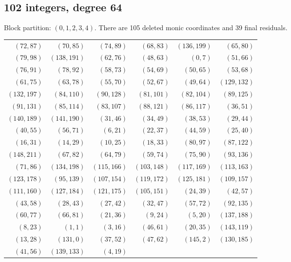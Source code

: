\subsection{102 integers, degree 64}
Block partition: $(0,1,2,3,4)$.
There are 105 deleted monic coordinates and 39 final residuals.
\begin{center}\small\begin{tabular}{rrrrrr}\toprule
$(72,87)$ & $(70,85)$ & $(74,89)$ & $(68,83)$ & $(136,199)$ & $(65,80)$\\
$(79,98)$ & $(138,191)$ & $(62,76)$ & $(48,63)$ & $(0,7)$ & $(51,66)$\\
$(76,91)$ & $(78,92)$ & $(58,73)$ & $(54,69)$ & $(50,65)$ & $(53,68)$\\
$(61,75)$ & $(63,78)$ & $(55,70)$ & $(52,67)$ & $(49,64)$ & $(129,132)$\\
$(132,197)$ & $(84,110)$ & $(90,128)$ & $(81,101)$ & $(82,104)$ & $(89,125)$\\
$(91,131)$ & $(85,114)$ & $(83,107)$ & $(88,121)$ & $(86,117)$ & $(36,51)$\\
$(140,189)$ & $(141,190)$ & $(31,46)$ & $(34,49)$ & $(38,53)$ & $(29,44)$\\
$(40,55)$ & $(56,71)$ & $(6,21)$ & $(22,37)$ & $(44,59)$ & $(25,40)$\\
$(16,31)$ & $(14,29)$ & $(10,25)$ & $(18,33)$ & $(80,97)$ & $(87,122)$\\
$(148,211)$ & $(67,82)$ & $(64,79)$ & $(59,74)$ & $(75,90)$ & $(93,136)$\\
$(71,86)$ & $(134,198)$ & $(115,166)$ & $(103,148)$ & $(117,169)$ & $(113,163)$\\
$(123,178)$ & $(95,139)$ & $(107,154)$ & $(119,172)$ & $(125,181)$ & $(109,157)$\\
$(111,160)$ & $(127,184)$ & $(121,175)$ & $(105,151)$ & $(24,39)$ & $(42,57)$\\
$(43,58)$ & $(28,43)$ & $(27,42)$ & $(32,47)$ & $(57,72)$ & $(92,135)$\\
$(60,77)$ & $(66,81)$ & $(21,36)$ & $(9,24)$ & $(5,20)$ & $(137,188)$\\
$(8,23)$ & $(1,1)$ & $(3,16)$ & $(46,61)$ & $(20,35)$ & $(143,119)$\\
$(13,28)$ & $(131,0)$ & $(37,52)$ & $(47,62)$ & $(145,2)$ & $(130,185)$\\
$(41,56)$ & $(139,133)$ & $(4,19)$ &  &  & \\
\bottomrule\end{tabular}\end{center}
